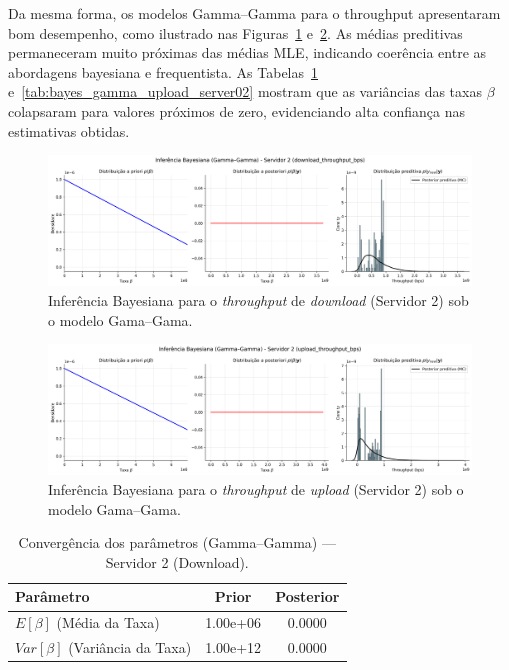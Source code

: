\documentclass{article}
\begin{document}
Da mesma forma, os modelos Gamma–Gamma para o throughput apresentaram bom desempenho, como ilustrado nas Figuras~\ref{fig:download_throughput_bps_bayesian_gammagamma_server02} e~\ref{fig:upload_throughput_bps_bayesian_gammagamma_server02}.
As médias preditivas permaneceram muito próximas das médias MLE, indicando coerência entre as abordagens bayesiana e frequentista.
As Tabelas~\ref{tab:bayes_gamma_download_server02} e~\ref{tab:bayes_gamma_upload_server02} mostram que as variâncias das taxas $\beta$ colapsaram para valores próximos de zero, evidenciando alta confiança nas estimativas obtidas.

\begin{figure}[htp]
	\centering
	\includegraphics[width=\textwidth]{../figures/bayes/download_throughput_bps_bayesian_gammagamma_server02.png}
	\caption{Inferência Bayesiana para o \textit{throughput} de \textit{download} (Servidor 2) sob o modelo Gama–Gama.}
	\label{fig:download_throughput_bps_bayesian_gammagamma_server02}
\end{figure}
\begin{figure}[htp]
	\centering
	\includegraphics[width=\textwidth]{../figures/bayes/upload_throughput_bps_bayesian_gammagamma_server02.png}
	\caption{Inferência Bayesiana para o \textit{throughput} de \textit{upload} (Servidor 2) sob o modelo Gama–Gama.}
	\label{fig:upload_throughput_bps_bayesian_gammagamma_server02}
\end{figure}

\begin{table}[H]
	\centering
	\caption{Convergência dos parâmetros (Gamma–Gamma) — Servidor 2 (Download).}
	\label{tab:bayes_gamma_download_server02}
	\begin{tabular}{lcc}
		\hline
		\textbf{Parâmetro} & \textbf{Prior} & \textbf{Posterior} \\ \hline
		$E[\beta]$ (Média da Taxa) & 1.00e+06 & 0.0000 \\
		$Var[\beta]$ (Variância da Taxa) & 1.00e+12 & 0.0000 \\ \hline
	\end{tabular}
\end{table}
\end{document}
